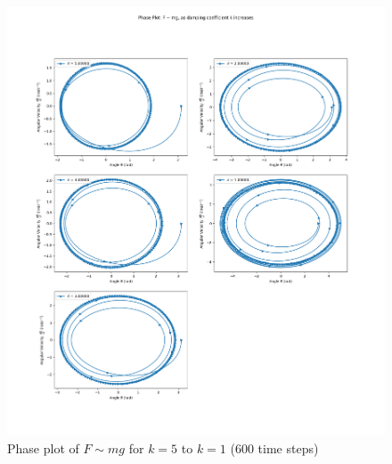 \documentclass[10pt, twocolumn]{article}
\begin{document}
\begin{figure}[H]
    \centering
    \includegraphics[width = \columnwidth]{Projects/ForcedSimplePendulum/Plots/Phase plot of F~mg as damping coefficient k increases from 5 to 1 (long).png}
    \caption{Phase plot of $F \sim{mg}$ for $k = 5$ to $k = 1$ (600 time steps)}
    \label{Phase plot of k 5 to 1 long}
\end{figure}
\end{document}

